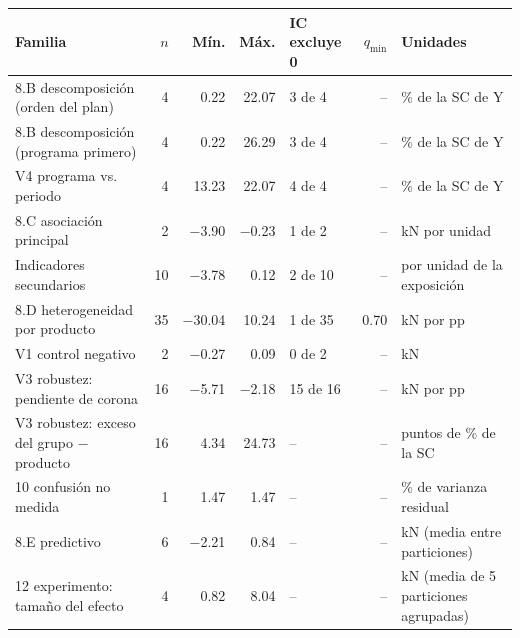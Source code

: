 \begin{tabular}{L{4.6cm}rrrlrL{4.2cm}}
\toprule
Familia & $n$ & Mín. & Máx. & IC excluye 0 & $q_{\min}$ & Unidades \\
\midrule
8.B descomposición (orden del plan) & 4 & 0.22 & 22.07 & 3 de 4 & -- & \% de la SC de Y \\
8.B descomposición (programa primero) & 4 & 0.22 & 26.29 & 3 de 4 & -- & \% de la SC de Y \\
V4 programa vs. periodo & 4 & 13.23 & 22.07 & 4 de 4 & -- & \% de la SC de Y \\
8.C asociación principal & 2 & −3.90 & −0.23 & 1 de 2 & -- & kN por unidad \\
Indicadores secundarios & 10 & −3.78 & 0.12 & 2 de 10 & -- & por unidad de la exposición \\
8.D heterogeneidad por producto & 35 & −30.04 & 10.24 & 1 de 35 & 0.70 & kN por pp \\
V1 control negativo & 2 & −0.27 & 0.09 & 0 de 2 & -- & kN \\
V3 robustez: pendiente de corona & 16 & −5.71 & −2.18 & 15 de 16 & -- & kN por pp \\
V3 robustez: exceso del grupo − producto & 16 & 4.34 & 24.73 & -- & -- & puntos de \% de la SC \\
10 confusión no medida & 1 & 1.47 & 1.47 & -- & -- & \% de varianza residual \\
8.E predictivo & 6 & −2.21 & 0.84 & -- & -- & kN (media entre particiones) \\
12 experimento: tamaño del efecto & 4 & 0.82 & 8.04 & -- & -- & kN (media de 5 particiones agrupadas) \\
\bottomrule
\end{tabular}
